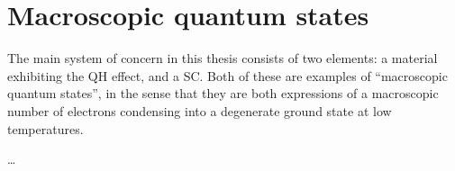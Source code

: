 \chapter{Macroscopic quantum states}
\label{chap:macroStates}

The main system of concern in this thesis consists of two elements: a material exhibiting the \gls{QH} effect, and a \gls{SC}. Both of these are examples of ``macroscopic quantum states'', in the sense that they are both expressions of a macroscopic number of electrons condensing into a degenerate ground state at low temperatures.

\dots


